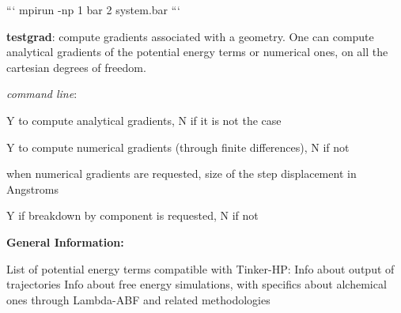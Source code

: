 ``` mpirun -\/np 1 bar 2 system.\-bar ```


\begin{DoxyEnumerate}
\item {\bfseries testgrad}\-: compute gradients associated with a geometry. One can compute analytical gradients of the potential energy terms or numerical ones, on all the cartesian degrees of freedom.
\begin{DoxyItemize}
\item {\itshape command line}\-:
\begin{DoxyItemize}
\item Y to compute analytical gradients, N if it is not the case
\item Y to compute numerical gradients (through finite differences), N if not
\item when numerical gradients are requested, size of the step displacement in Angstroms
\item Y if breakdown by component is requested, N if not
\end{DoxyItemize}
\end{DoxyItemize}
\end{DoxyEnumerate}

{\bfseries General Information\-:}

List of potential energy terms compatible with Tinker-\/\-H\-P\-: Info about output of trajectories Info about free energy simulations, with specifics about alchemical ones through Lambda-\/\-A\-B\-F and related methodologies 
